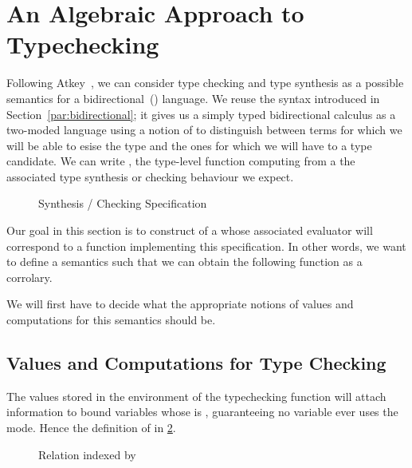 \section{An Algebraic Approach to Typechecking}
\label{section:typechecking}

Following Atkey~\citeyear{atkey2015algebraic}, we can consider type
checking and type synthesis as a possible semantics for a
bidirectional~(\cite{pierce2000local}) language.
%
We reuse the syntax introduced in Section~\ref{par:bidirectional}; it
gives us a simply typed bidirectional calculus as a two-moded language using
a notion of  to distinguish between terms for which we will be able
to esise the type and the ones for which we will have to
 a type candidate. We can write , the type-level
function computing from a  the associated type synthesis or
checking behaviour we expect.


\begin{figure}[h]
\caption{ Synthesis / Checking Specification\label{fig:typecheckspec}}
\end{figure}

Our goal in this section is to construct of a  whose
associated evaluator will correspond to a function implementing this
specification. In other words, we want to define a semantics
 such that we can obtain the following  function
as a corrolary.


We will first have to decide what the appropriate notions of values and
computations for this semantics should be.

\subsection{Values and Computations for Type Checking}

The values stored in the environment of the typechecking function will
attach  information to bound variables whose  is
, guaranteeing no variable ever uses the  mode.
Hence the definition of  in \cref{fig:typecheckvar}.

\begin{figure}[h]
\caption{ Relation indexed by \label{fig:typecheckvar}}
\end{figure}

